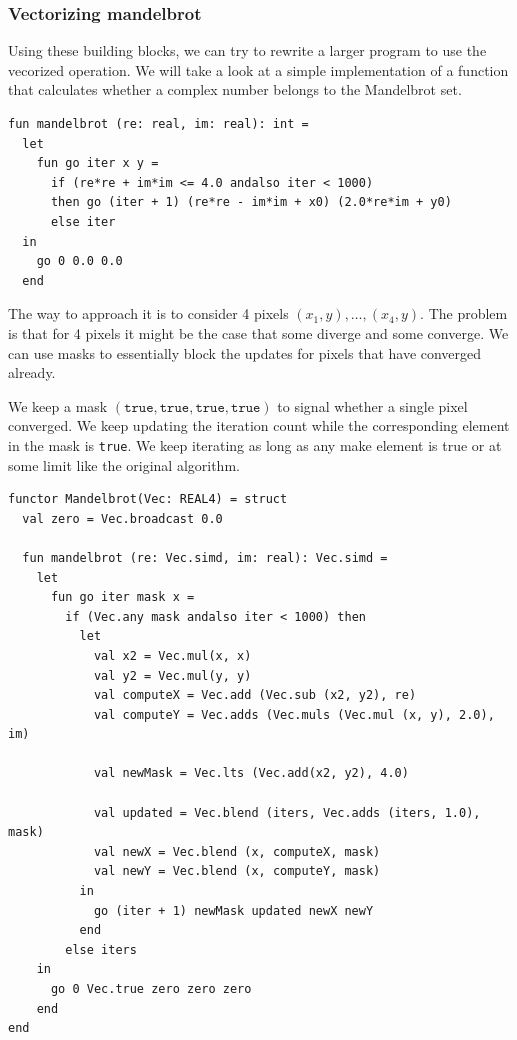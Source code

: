 \documentclass{article}
\begin{document}
\subsubsection{Vectorizing mandelbrot}

Using these building blocks, we can try to rewrite a larger program to use the vecorized operation. We will take a look at a simple implementation of a function that calculates whether a complex number belongs to the Mandelbrot set.
\begin{lstlisting}
fun mandelbrot (re: real, im: real): int =
  let
    fun go iter x y =
      if (re*re + im*im <= 4.0 andalso iter < 1000)
      then go (iter + 1) (re*re - im*im + x0) (2.0*re*im + y0)
      else iter
  in
    go 0 0.0 0.0
  end
\end{lstlisting}



The way to approach it is to consider 4 pixels $(x_1, y), \ldots, (x_4, y)$. The problem is that for 4 pixels it might be the case that some diverge and some converge. We can use masks to essentially block the updates for pixels that have converged already.

We keep a mask $(\texttt{true}, \texttt{true}, \texttt{true}, \texttt{true})$ to signal whether a single pixel converged. We keep updating the iteration count while the corresponding element in the mask is \texttt{true}. We keep iterating as long as any make element is true or at some limit like the original algorithm.

\begin{lstlisting}
functor Mandelbrot(Vec: REAL4) = struct
  val zero = Vec.broadcast 0.0

  fun mandelbrot (re: Vec.simd, im: real): Vec.simd =
    let
      fun go iter mask x =
        if (Vec.any mask andalso iter < 1000) then
          let
            val x2 = Vec.mul(x, x)
            val y2 = Vec.mul(y, y)
            val computeX = Vec.add (Vec.sub (x2, y2), re)
            val computeY = Vec.adds (Vec.muls (Vec.mul (x, y), 2.0), im)

            val newMask = Vec.lts (Vec.add(x2, y2), 4.0)

            val updated = Vec.blend (iters, Vec.adds (iters, 1.0), mask)
            val newX = Vec.blend (x, computeX, mask)
            val newY = Vec.blend (x, computeY, mask)
          in
            go (iter + 1) newMask updated newX newY
          end
        else iters
    in
      go 0 Vec.true zero zero zero
    end
end
\end{lstlisting}
\end{document}
